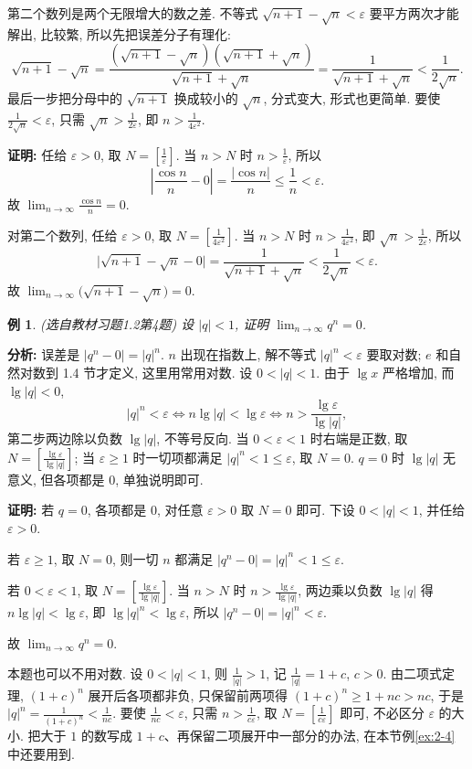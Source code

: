 \documentclass[UTF8,openany]{ctexbook}
\theoremstyle{chinesetextbook}
\newtheorem{example}{例}[section]
\newenvironment{cnproof}{\par\indent\textbf{证明:} \ignorespaces}{\par}
\begin{document}
第二个数列是两个无限增大的数之差. 不等式 $\sqrt{n+1}-\sqrt n<\varepsilon$ 要平方两次才能解出, 比较繁, 所以先把误差分子有理化:
\[
\sqrt{n+1}-\sqrt n=\frac{(\sqrt{n+1}-\sqrt n)(\sqrt{n+1}+\sqrt n)}{\sqrt{n+1}+\sqrt n}=\frac1{\sqrt{n+1}+\sqrt n}<\frac1{2\sqrt n}.
\]
最后一步把分母中的 $\sqrt{n+1}$ 换成较小的 $\sqrt n$, 分式变大, 形式也更简单. 要使 $\displaystyle\frac1{2\sqrt n}<\varepsilon$, 只需 $\displaystyle\sqrt n>\frac1{2\varepsilon}$, 即 $\displaystyle n>\frac1{4\varepsilon^2}$.
\begin{cnproof}
任给 $\varepsilon>0$, 取 $\displaystyle N=\left[\frac1\varepsilon\right]$. 当 $n>N$ 时 $\displaystyle n>\frac1\varepsilon$, 所以
\[
\left|\frac{\cos n}n-0\right|=\frac{|\cos n|}n\le\frac1n<\varepsilon.
\]
故 $\displaystyle\lim_{n\to\infty}\frac{\cos n}n=0$.

对第二个数列, 任给 $\varepsilon>0$, 取 $\displaystyle N=\left[\frac1{4\varepsilon^2}\right]$. 当 $n>N$ 时 $\displaystyle n>\frac1{4\varepsilon^2}$, 即 $\displaystyle\sqrt n>\frac1{2\varepsilon}$, 所以
\[
\bigl|\sqrt{n+1}-\sqrt n-0\bigr|=\frac1{\sqrt{n+1}+\sqrt n}<\frac1{2\sqrt n}<\varepsilon.
\]
故 $\displaystyle\lim_{n\to\infty}\bigl(\sqrt{n+1}-\sqrt n\bigr)=0$.
\end{cnproof}
\begin{example}\label{ex:h12-4}
\textnormal{(选自教材习题1.2第4题)} 设 $|q|<1$, 证明 $\displaystyle\lim_{n\to\infty}q^n=0$.
\end{example}
\par\indent\textbf{分析:} 误差是 $|q^n-0|=|q|^n$. $n$ 出现在指数上, 解不等式 $|q|^n<\varepsilon$ 要取对数; $e$ 和自然对数到 1.4 节才定义, 这里用常用对数. 设 $0<|q|<1$. 由于 $\lg x$ 严格增加, 而 $\lg|q|<0$,
\[
|q|^n<\varepsilon\iff n\lg|q|<\lg\varepsilon\iff n>\frac{\lg\varepsilon}{\lg|q|},
\]
第二步两边除以负数 $\lg|q|$, 不等号反向. 当 $0<\varepsilon<1$ 时右端是正数, 取 $\displaystyle N=\left[\frac{\lg\varepsilon}{\lg|q|}\right]$; 当 $\varepsilon\ge1$ 时一切项都满足 $|q|^n<1\le\varepsilon$, 取 $N=0$. $q=0$ 时 $\lg|q|$ 无意义, 但各项都是 $0$, 单独说明即可.
\begin{cnproof}
若 $q=0$, 各项都是 $0$, 对任意 $\varepsilon>0$ 取 $N=0$ 即可. 下设 $0<|q|<1$, 并任给 $\varepsilon>0$.

若 $\varepsilon\ge1$, 取 $N=0$, 则一切 $n$ 都满足 $|q^n-0|=|q|^n<1\le\varepsilon$.

若 $0<\varepsilon<1$, 取 $\displaystyle N=\left[\frac{\lg\varepsilon}{\lg|q|}\right]$. 当 $n>N$ 时 $\displaystyle n>\frac{\lg\varepsilon}{\lg|q|}$, 两边乘以负数 $\lg|q|$ 得 $n\lg|q|<\lg\varepsilon$, 即 $\lg|q|^n<\lg\varepsilon$, 所以 $|q^n-0|=|q|^n<\varepsilon$.

故 $\displaystyle\lim_{n\to\infty}q^n=0$.
\end{cnproof}
本题也可以不用对数. 设 $0<|q|<1$, 则 $\displaystyle\frac1{|q|}>1$, 记 $\displaystyle\frac1{|q|}=1+c$, $c>0$. 由二项式定理, $(1+c)^n$ 展开后各项都非负, 只保留前两项得 $(1+c)^n\ge1+nc>nc$, 于是 $\displaystyle|q|^n=\frac1{(1+c)^n}<\frac1{nc}$. 要使 $\displaystyle\frac1{nc}<\varepsilon$, 只需 $\displaystyle n>\frac1{c\varepsilon}$, 取 $\displaystyle N=\left[\frac1{c\varepsilon}\right]$ 即可, 不必区分 $\varepsilon$ 的大小. 把大于 $1$ 的数写成 $1+c$、再保留二项展开中一部分的办法, 在本节例\ref{ex:2-4} 中还要用到.
\end{document}
